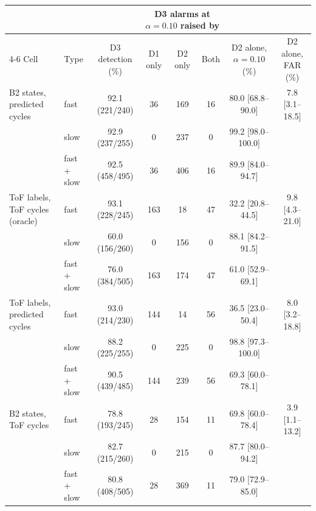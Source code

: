 \begin{tabular}{@{}llcccccc@{}}
\toprule
 & & & \multicolumn{3}{c}{D3 alarms at $\alpha=0.10$ raised by} & & \\
\cmidrule(lr){4-6}
Cell & Type & D3 detection (\%) & D1 only & D2 only & Both & D2 alone, $\alpha=0.10$ (\%) & D2 alone, FAR (\%) \\
\midrule
B2 states, predicted cycles & fast & 92.1 (221/240) & 36 & 169 & 16 & 80.0 [68.8--90.0] & 7.8 [3.1--18.5] \\ %
 & slow & 92.9 (237/255) & 0 & 237 & 0 & 99.2 [98.0--100.0] &  \\ %
 & fast + slow & 92.5 (458/495) & 36 & 406 & 16 & 89.9 [84.0--94.7] &  \\ %
\midrule
ToF labels, ToF cycles (oracle) & fast & 93.1 (228/245) & 163 & 18 & 47 & 32.2 [20.8--44.5] & 9.8 [4.3--21.0] \\ %
 & slow & 60.0 (156/260) & 0 & 156 & 0 & 88.1 [84.2--91.5] &  \\ %
 & fast + slow & 76.0 (384/505) & 163 & 174 & 47 & 61.0 [52.9--69.1] &  \\ %
\midrule
ToF labels, predicted cycles & fast & 93.0 (214/230) & 144 & 14 & 56 & 36.5 [23.0--50.4] & 8.0 [3.2--18.8] \\ %
 & slow & 88.2 (225/255) & 0 & 225 & 0 & 98.8 [97.3--100.0] &  \\ %
 & fast + slow & 90.5 (439/485) & 144 & 239 & 56 & 69.3 [60.0--78.1] &  \\ %
\midrule
B2 states, ToF cycles & fast & 78.8 (193/245) & 28 & 154 & 11 & 69.8 [60.0--78.4] & 3.9 [1.1--13.2] \\ %
 & slow & 82.7 (215/260) & 0 & 215 & 0 & 87.7 [80.0--94.2] &  \\ %
 & fast + slow & 80.8 (408/505) & 28 & 369 & 11 & 79.0 [72.9--85.0] &  \\ %
\bottomrule
\end{tabular}
